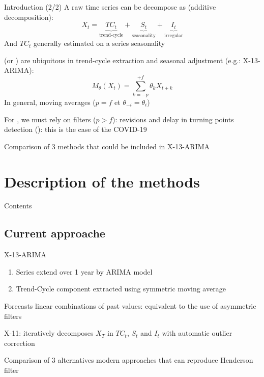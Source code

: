 \documentclass[10pt,xcolor=table,color={dvipsnames,usenames},ignorenonframetext,usepdftitle=false,english]{beamer}
\newcommand\1{\mathds{1}}
\begin{document}
\begin{frame}{Introduction (2/2)}
\protect\hypertarget{introduction-22}{}
A raw time series can be decompose as (additive decomposition): \[
X_t=\underbrace{TC_t}_{\text{trend-cycle}}+
\underbrace{S_t}_{\text{seasonality}}+
\underbrace{I_t}_{\text{irregular}}
\] And \(TC_t\) generally estimated on a series 
seasonality

\pause

 (or ) are
ubiquitous in trend-cycle extraction and seasonal adjustment (e.g.:
X-13-ARIMA): \[
M_\theta(X_t)=\sum_{k=-p}^{+f}\theta_kX_{t+k}
\] \pause  \faArrowCircleRight{} In general, 
moving averages (\(p=f\) et \(\theta_{-i}=\theta_i\))

\pause

\faArrowCircleRight{} For , we must
rely on  filters (\(p>f\)): revisions and delay in
turning points detection (): this is the case of
the COVID-19

\bigskip \pause

\faArrowCircleRight{} Comparison of 3 methods that could be included in
X-13-ARIMA
\end{frame}

\hypertarget{description-of-the-methods}{%
\section{Description of the methods}\label{description-of-the-methods}}

\begin{frame}{Contents}
\protect\hypertarget{contents}{}
\end{frame}

\hypertarget{current-approache}{%
\subsection{Current approache}\label{current-approache}}

\begin{frame}{X-13-ARIMA}
\protect\hypertarget{x-13-arima}{}
\begin{enumerate}
\item
  Series extend over 1 year by ARIMA model
\item
  Trend-Cycle component extracted using symmetric
   moving average
\end{enumerate}

\pause

\faArrowCircleRight{} Forecasts linear combinations of past values:
equivalent to the use of asymmetric filters

\bigskip\pause

\faArrowCircleRight{} X-11: iteratively decomposes \(X_T\) in \(TC_t\),
\(S_t\) and \(I_t\) with automatic outlier correction

\bigskip\pause

\faArrowCircleRight{} Comparison of 3 alternatives modern approaches
that can reproduce Henderson filter
\end{frame}
\end{document}
